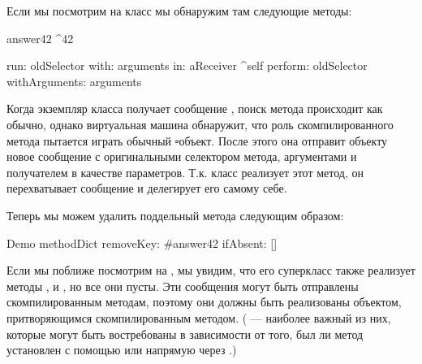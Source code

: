 \documentclass[a4paper,10pt,twoside]{book}
\begin{document}
{%
Если мы посмотрим на класс  мы обнаружим там следующие методы:
\begin{code}{}
answer42
	^42

run: oldSelector with: arguments in: aReceiver
	^self perform: oldSelector withArguments: arguments
\end{code}

Когда экземпляр класса  получает сообщение , поиск метода происходит как обычно, однако виртуальная машина обнаружит, что роль скомпилированного метода пытается играть обычный \st-объект.
После этого она отправит объекту новое сообщение  с оригинальными селектором метода, аргументами и получателем в качестве параметров.
Т.к. класс  реализует этот метод, он перехватывает сообщение и делегирует его самому себе.

Теперь мы можем удалить поддельный метода следующим образом:
\begin{code}{}
Demo methodDict removeKey: #answer42 ifAbsent: []
\end{code}

Если мы поближе посмотрим на , мы увидим, что его суперкласс также реализует методы ,  и , но все они пусты. Эти сообщения могут быть отправлены скомпилированным методам, поэтому они должны быть реализованы объектом, притворяющимся скомпилированным методом. ( --- наиболее важный из них, которые могут быть востребованы в зависимости от того, был ли метод установлен с помощью  или напрямую через .)

}
\end{document}
